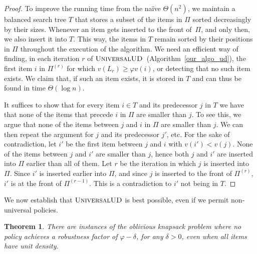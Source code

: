 \documentclass[11pt]{article}
\newtheorem{theorem}{Theorem}
\begin{document}
\begin{proof}
To improve the running time from the naïve $\Theta(n^{2})$, we maintain
a balanced search tree $T$ that stores a subset of the items in $\Pi$
sorted decreasingly by their sizes. Whenever an item gets inserted
to the front of~$\Pi$, and only then, we also insert it into $T$.
This way, the items in $T$ remain sorted by their positions in $\Pi$
throughout the execution of the algorithm. We need an efficient way
of finding, in each iteration $r$ of $\textsc{UniversalUD}$~(Algorithm~\ref{our_algo_ud}),
the first item $i$ in $\Pi^{(r)}$ for which $v(L_{r})\geq\varphi v(i)$,
or detecting that no such item exists. We claim that, if such an item
exists, it is stored in $T$ and can thus be found in time $\Theta(\log n)$.

It suffices to show that for every item $i\in T$ and its predecessor
$j$ in $T$ we have that none of the items that precede $i$ in $\Pi$
are smaller than $j$. To see this, we argue that none of the items
between $j$ and $i$ in $\Pi$ are smaller than $j$. We can then
repeat the argument for $j$ and its predecessor $j'$, etc. For the
sake of contradiction, let $i'$ be the first item between $j$ and
$i$ with $v(i')<v(j)$. None of the items between $j$ and $i'$
are smaller than $j$, hence both $j$ and $i'$ are inserted into
$\Pi$ earlier than all of them. Let $r$ be the iteration in which
$j$ is inserted into $\Pi$. Since $i'$ is inserted earlier into
$\Pi$, and since $j$ is inserted to the front of $\Pi^{(r)}$, $i'$
is at the front of $\Pi^{(r-1)}$. This is a contradiction to $i'$
not being in $T$.
\end{proof}
We now establish that $\textsc{UniversalUD}$ is best possible, even
if we permit non-universal policies.
\begin{theorem}
There are instances of the oblivious knapsack problem where no policy
achieves a robustness factor of $\varphi-\delta$, for any $\delta>0$,
even when all items have unit density.\end{theorem}
\end{document}

